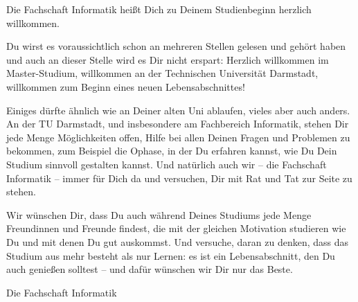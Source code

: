 {Die Fachschaft Informatik heißt Dich zu Deinem Studienbeginn herzlich willkommen.}{
Du wirst es voraussichtlich schon an mehreren Stellen gelesen und gehört haben und auch an dieser Stelle wird es Dir nicht erspart: Herzlich willkommen im Master-Studium, willkommen an der Technischen Universität Darmstadt, willkommen zum Beginn eines neuen Lebensabschnittes!

Einiges dürfte ähnlich wie an Deiner alten Uni ablaufen, vieles aber auch anders. An der TU Darmstadt, und insbesondere am Fachbereich Informatik, stehen Dir jede Menge Möglichkeiten offen, Hilfe bei allen Deinen Fragen und Problemen zu bekommen, zum Beispiel die Ophase, in der Du erfahren kannst, wie Du Dein Studium sinnvoll gestalten kannst. Und natürlich auch wir – die Fachschaft Informatik – immer für Dich da und versuchen, Dir mit Rat und Tat zur Seite zu stehen.

Wir wünschen Dir, dass Du auch während Deines Studiums jede Menge Freundinnen und Freunde findest, die mit der gleichen Motivation studieren wie Du und mit denen Du gut auskommst. Und versuche, daran zu denken, dass das Studium aus mehr besteht als nur Lernen: es ist ein Lebensabschnitt, den Du auch genießen solltest – und dafür wünschen wir Dir nur das Beste.
}
{Die Fachschaft Informatik}

\vfill

\noindent
{}

\newpage
